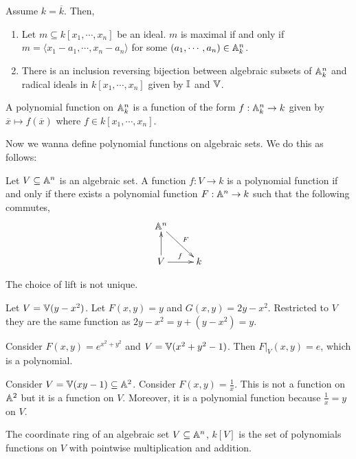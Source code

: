 \documentclass[12pt]{article}
\begin{document}
\begin{theorem}
    Assume $k = \overline{k}$. Then, 
    \begin{enumerate}
        \item Let $m \subseteq k[x_1, \cdots, x_n]$ be an ideal. $m$ is maximal if and only if $m = \langle x_1-a_1, \cdots, x_n-a_n\rangle$ for some $(a_1, \cdots, a_n) \in \mathbb A^n_k$. 
        \item There is an inclusion reversing bijection between algebraic subsets of $\mathbb A^n_k$ and radical ideals in $k[x_1, \cdots, x_n]$ given by $\mathbb I$ and $\mathbb V$. 
    \end{enumerate}
\end{theorem}

\begin{definition}
    A polynomial function on $\mathbb A^n_k$ is a function of the form $f: \mathbb A^n_k \to k$ given by $\overline{x} \mapsto f(\overline{x})$ where $f \in k[x_1, \cdots, x_n]$. 
\end{definition}

Now we wanna define polynomial functions on algebraic sets. We do this as follows:
\begin{definition}
    Let $V \subseteq \mathbb A^n$ is an algebraic set. A function $f: V \to k$ is a polynomial function if and only if there exists a polynomial function $F: \mathbb A^n \to k$ such that the following commutes, 
        \[ \xymatrix{ \A^n \ar[rd]^F \\ V \ar[u] \ar[r]^f & k }\]
\end{definition}

The choice of lift is not unique. 
\begin{example}
    Let $V = \mathbb V(y-x^2)$. Let $F(x,y) = y$ and $G(x,y) = 2y-x^2$. Restricted to $V$ they are the same function as $2y-x^2 = y+(y-x^2) = y$. 
\end{example}

\begin{example}
    Consider $F(x,y) = e^{x^2+y^2}$ and $V = \mathbb V(x^2+y^2-1)$. Then $F|_V(x,y) = e$, which is a polynomial. 
\end{example}

\begin{example}
    Consider $V = \mathbb V(xy-1) \subseteq \mathbb A^2$. Consider $F(x,y) = \frac{1}{x}$. This is not a function on $\mathbb A^2$ but it is a function on $V$. Moreover, it is a polynomial function because $\frac{1}{x} = y$ on $V$. 
\end{example}

\begin{definition}
    The coordinate ring of an algebraic set $V \subseteq \mathbb A^n$, $k[V]$ is the set of polynomials functions on $V$ with pointwise multiplication and addition. 
\end{definition}
\end{document}

